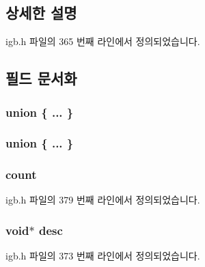 \subsection{상세한 설명}


igb.\+h 파일의 365 번째 라인에서 정의되었습니다.



\subsection{필드 문서화}
\subsubsection[{\texorpdfstring{"@67}{@67}}]{\setlength{\rightskip}{0pt plus 5cm}union \{ ... \} }\hypertarget{structigb__ring_a65dcdb3dcab618aafa42ae30b747f4eb}{}\label{structigb__ring_a65dcdb3dcab618aafa42ae30b747f4eb}
\subsubsection[{\texorpdfstring{"@69}{@69}}]{\setlength{\rightskip}{0pt plus 5cm}union \{ ... \} }\hypertarget{structigb__ring_a01a4c2a36c5436cde67c5e8b51666d44}{}\label{structigb__ring_a01a4c2a36c5436cde67c5e8b51666d44}
\subsubsection[{\texorpdfstring{count}{count}}]{ count}\hypertarget{structigb__ring_a5e12546cd8600448c169facbe4d7d22f}{}\label{structigb__ring_a5e12546cd8600448c169facbe4d7d22f}


igb.\+h 파일의 379 번째 라인에서 정의되었습니다.

\subsubsection[{\texorpdfstring{desc}{desc}}]{\setlength{\rightskip}{0pt plus 5cm}void$\ast$ desc}\hypertarget{structigb__ring_aabab4a57f1bca978579e5878afb257f8}{}\label{structigb__ring_aabab4a57f1bca978579e5878afb257f8}


igb.\+h 파일의 373 번째 라인에서 정의되었습니다.


